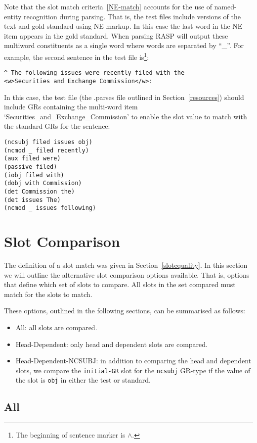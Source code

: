\documentclass[10pt]{article}
\newcommand{\stt}[1]{{\small\texttt{#1}}}
\begin{document}
Note that the slot match criteria~\ref{NE-match}
accounts for the use of named-entity recognition 
during parsing. That is, the test files
include versions of the text and gold standard using
NE markup. In this case the last word in the NE item appears
in the gold standard. When parsing RASP will output
these multiword constituents as a single word
where words are separated by ``\_''.
For example, the second sentence in the test file 
is\footnote{The beginning of sentence marker 
is $\wedge$.}:
\begin{verbatim}
^ The following issues were recently filed with the 
<w>Securities and Exchange Commission</w>:
\end{verbatim}

In this case, the test file (the .parses file outlined
in Section~\ref{resources}) should include GRs containing
the multi-word item `Securities\_and\_Exchange\_Commission' 
to enable the slot value to match with the standard 
GRs for the sentence:
\begin{verbatim}
(ncsubj filed issues obj)
(ncmod _ filed recently)
(aux filed were)
(passive filed)
(iobj filed with)
(dobj with Commission)
(det Commission the)
(det issues The)
(ncmod _ issues following)
\end{verbatim}

\section{Slot Comparison}
\label{slot-compare}

The definition of a slot match was given in Section~\ref{slotequality}.
In this section we will outline the alternative slot comparison
options available. That is, options that define which set of slots
to compare. All slots in the set compared must match for 
the slots to match. 

These options, outlined in the following sections, 
can be summarised as follows:
\begin{itemize}
\item All: all slots are compared.
\item Head-Dependent: only head and dependent slots are compared.
\item Head-Dependent-NCSUBJ: in addition to comparing the head and dependent slots,
we compare the \stt{initial-GR} slot for the \stt{ncsubj}
GR-type if the value of the slot is \stt{obj} in either
the test or standard.
\end{itemize}

\subsection{All}
\end{document}
